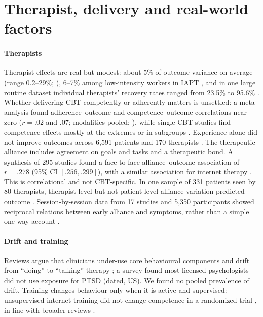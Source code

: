 \section{Therapist, delivery and real-world factors}\label{sec:delivery}
\paragraph{Therapists} Therapist effects are real but modest: about 5\% of outcome variance on average (range 0.2--29\%; \citealp{johns2019therapist}), 6--7\% among low-intensity workers in IAPT \citep{firth2015pwp}, and in one large routine dataset individual therapists' recovery rates ranged from 23.5\% to 95.6\% \citep{saxon2012therapist}.
Whether delivering CBT competently or adherently matters is unsettled: a meta-analysis found adherence--outcome and competence--outcome correlations near zero ($r=.02$ and $.07$; modalities pooled; \citealp{webb2010adherence}), while single CBT studies find competence effects mostly at the extremes or in subgroups \citep{branson2015competence,strunk2010competence,kuyken2008competence}.
Experience alone did not improve outcomes across 6,591 patients and 170 therapists \citep{goldberg2016experience}.
The therapeutic alliance includes agreement on goals and tasks and a therapeutic bond.
A synthesis of 295 studies found a face-to-face alliance--outcome association of $r=.278$ (95\% CI $[.256,.299]$), with a similar association for internet therapy \citep{fluckiger2018alliance}.
This is correlational and not CBT-specific.
In one sample of 331 patients seen by 80 therapists, therapist-level but not patient-level alliance variation predicted outcome \citep{baldwin2007alliance}.
Session-by-session data from 17 studies and 5,350 participants showed reciprocal relations between early alliance and symptoms, rather than a simple one-way account \citep{fluckiger2020reciprocal}.

\paragraph{Drift and training} Reviews argue that clinicians under-use core behavioural components and drift from ``doing'' to ``talking'' therapy \citep{waller2009drift,waller2016driftredux}; a survey found most licensed psychologists did not use exposure for PTSD \citep{becker2004exposure} (dated, US).
We found no pooled prevalence of drift.
Training changes behaviour only when it is active and supervised: unsupervised internet training did not change competence in a randomized trial \citep{rakovshik2016supervision}, in line with broader reviews \citep{beidas2010training,shafran2009gap}.


